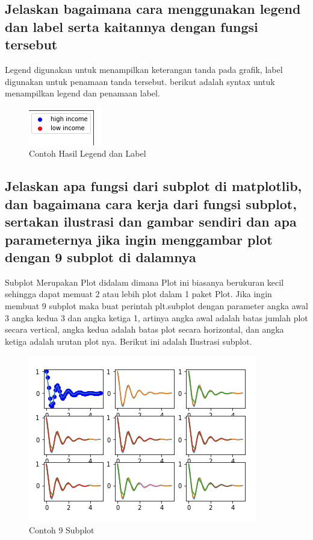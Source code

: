 \subsection{Jelaskan bagaimana cara menggunakan legend dan label serta kaitannya dengan fungsi tersebut}
Legend digunakan untuk menampilkan keterangan tanda pada grafik, label digunakan untuk penamaan tanda tersebut.
berikut adalah syntax untuk menampilkan legend dan penamaan label.



\begin{figure}[h]
\centering
\includegraphics[scale=1]{figures/6/Teori/1174002/no4legend.png}
\caption{Contoh Hasil Legend dan Label}
\label{fig:contoh Legend}
\end{figure}

\subsection{Jelaskan apa fungsi dari subplot di matplotlib, dan bagaimana cara kerja dari fungsi subplot, sertakan ilustrasi dan gambar sendiri dan apa parameternya jika ingin menggambar plot dengan 9 subplot di dalamnya}
Subplot Merupakan Plot didalam dimana Plot ini biasanya berukuran kecil sehingga dapat memuat 2 atau lebih plot dalam 1 paket Plot.\newline
Jika ingin membuat 9 subplot maka buat perintah plt.subplot dengan parameter angka awal 3 angka kedua 3 dan angka ketiga 1, artinya angka awal adalah batas jumlah plot secara vertical, angka kedua adalah batas plot secara horizontal, dan angka ketiga adalah urutan plot nya.
Berikut ini adalah Ilustrasi subplot.



\begin{figure}[h]
\centering
\includegraphics[scale=0.7]{figures/6/Teori/1174002/subplot.png}
\caption{Contoh 9 Subplot}
\label{fig:contoh subplot}
\end{figure}

